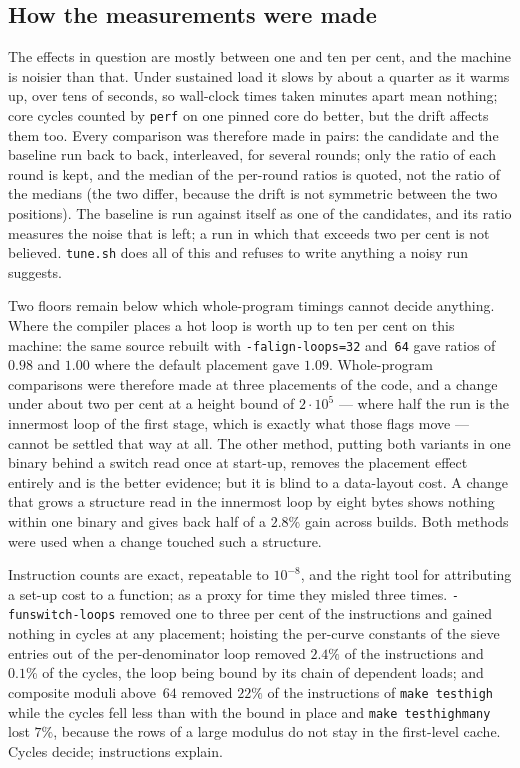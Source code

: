 \documentclass[12pt,a4paper,oneside]{amsart}
\begin{document}
\subsection{How the measurements were made}\label{app:measure}

The effects in question are mostly between one and ten per cent, and the
machine is noisier than that. Under sustained load it slows by about a
quarter as it warms up, over tens of seconds, so wall-clock times taken
minutes apart mean nothing; core cycles counted by \texttt{perf} on one
pinned core do better, but the drift affects them too. Every comparison was
therefore made in pairs: the candidate and the baseline run back to back,
interleaved, for several rounds; only the ratio of each round is kept, and
the median of the per-round ratios is quoted, not the ratio of the medians
(the two differ, because the drift is not symmetric between the two
positions). The baseline is run against itself as one of the candidates,
and its ratio measures the noise that is left; a run in which that exceeds
two per cent is not believed. \texttt{tune.sh} does all of this and refuses
to write anything a noisy run suggests.

Two floors remain below which whole-program timings cannot decide anything.
Where the compiler places a hot loop is worth up to ten per cent on this
machine: the same source rebuilt with \texttt{-falign-loops=32} and~\texttt{64}
gave ratios of $0.98$ and $1.00$ where the default placement gave $1.09$.
Whole-program comparisons were therefore made at three placements of the
code, and a change under about two per cent at a height bound of
$2\cdot10^5$ --- where half the run is the innermost loop of the first stage,
which is exactly what those flags move --- cannot be settled that way at
all. The other method, putting both variants in one binary behind a switch
read once at start-up, removes the placement effect entirely and is the
better evidence; but it is blind to a data-layout cost. A change that grows
a structure read in the innermost loop by eight bytes shows nothing within
one binary and gives back half of a $2.8\%$ gain across builds. Both methods
were used when a change touched such a structure.

Instruction counts are exact, repeatable to $10^{-8}$, and the right tool for
attributing a set-up cost to a function; as a proxy for time they misled
three times. \texttt{-funswitch-loops} removed one to three per cent of the
instructions and gained nothing in cycles at any placement; hoisting the
per-curve constants of the sieve entries out of the per-denominator loop
removed $2.4\%$ of the instructions and $0.1\%$ of the cycles, the loop being
bound by its chain of dependent loads; and composite moduli above~$64$
removed $22\%$ of the instructions of \texttt{make testhigh} while the cycles
fell less than with the bound in place and \texttt{make testhighmany} lost
$7\%$, because the rows of a large modulus do not stay in the first-level
cache. Cycles decide; instructions explain.
\end{document}
